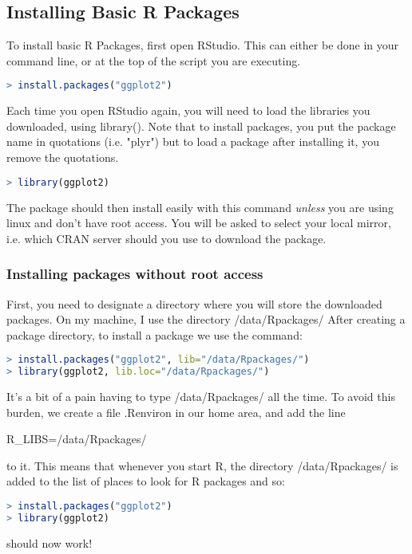\documentclass{article}
\begin{document}
\subsection{Installing Basic R Packages}
To install basic R Packages, first open RStudio. 
This can either be done in your command line, or at the top of the script you are executing. 
\begin{lstlisting}[language=R]
> install.packages("ggplot2")
\end{lstlisting}


Each time you open RStudio again, you will need to load the libraries you downloaded, using library(). Note that to install packages, you put the package name in quotations (i.e. "plyr") but to load a package after installing it, you remove the quotations.

\begin{lstlisting}[language=R]
> library(ggplot2)
\end{lstlisting}

The package should then install easily with this command \textit{unless} you are using linux and don't have root access. 
You will be asked to select your local mirror, i.e. which CRAN server should you use to download the package.

\subsubsection{	Installing packages without root access}
First, you need to designate a directory where you will store the downloaded packages. On my machine, I use the directory /data/Rpackages/ After creating a package directory, to install a package we use the command:

\begin{lstlisting}[language=R]
> install.packages("ggplot2", lib="/data/Rpackages/")
> library(ggplot2, lib.loc="/data/Rpackages/")
\end{lstlisting}


It's a bit of a pain having to type /data/Rpackages/ all the time. To avoid this burden,  we create a file .Renviron in our home area, and add the line 
\centerline{R\_LIBS=/data/Rpackages/ }to it. This means that whenever you start R, the directory /data/Rpackages/ is added to the list of places to look for R packages and so:
\begin{lstlisting}[language=R]
> install.packages("ggplot2")
> library(ggplot2)
\end{lstlisting}
should now work!
\end{document}
